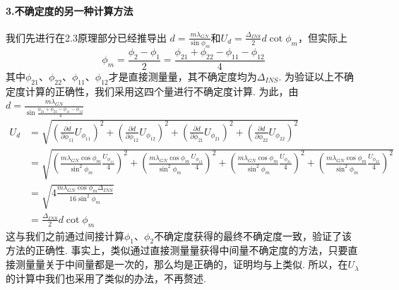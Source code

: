 \documentclass[UTF8]{ctexart}
\begin{document}
\paragraph{3.\quad 不确定度的另一种计算方法}\quad\par
我们先进行在2.3原理部分已经推导出
$\displaystyle{d=\frac{m\lambda_{GN}}{\sin\phi_m}}$和$\displaystyle{U_d=\frac{\Delta_{INS}}{2}d \cot\phi_m}$，但实际上
\[{\phi_m=\frac{\phi_2-\phi_1}{2}=\frac{\phi_{21}+\phi_{22}-\phi_{11}-\phi_{12}}{4}}\]
其中$\phi_{21}$、$\phi_{22}$、$\phi_{11}$、$\phi_{12}$才是直接测量量，其不确定度均为$\Delta_{INS}$. 为验证以上不确定度计算的正确性，我们采用这四个量进行不确定度计算. 为此，由$\displaystyle{d=\frac{m\lambda_{GN}}{\sin\frac{\phi_{21}+\phi_{22}-\phi_{11}-\phi_{12}}{4}}}$
\begin{equation}\begin{split}
    U_d&=
    \sqrt{(\frac{\partial d}{\partial \phi_{11}}U_{\phi_{11}})^2+(\frac{\partial d}{\partial \phi_{12}}U_{\phi_{12}})^2+(\frac{\partial d}{\partial \phi_{21}}U_{\phi_{21}})^2+(\frac{\partial d}{\partial \phi_{22}}U_{\phi_{22}})^2}\\
    &=\sqrt{
        (\frac{m\lambda_{GN}\cos\phi_m}
        {\sin^2\phi_m}\frac{U_{\phi_{11}}}{4})^2+
        (\frac{m\lambda_{GN}\cos\phi_m}
        {\sin^2\phi_m}\frac{U_{\phi_{12}}}{4})^2+
        (\frac{m\lambda_{GN}\cos\phi_m}
        {\sin^2\phi_m}\frac{U_{\phi_{21}}}{4})^2+
        (\frac{m\lambda_{GN}\cos\phi_m}
        {\sin^2\phi_m}\frac{U_{\phi_{22}}}{4})^2
    }\\
    &=\sqrt{4\frac{m\lambda_{GN}\cos\phi_m\Delta_{INS}}{16\sin^2\phi_m}}\\
    &=\frac{\Delta_{INS}}{2}d \cot\phi_m
\end{split}\end{equation}
这与我们之前通过间接计算$\phi_1$、$\phi_2$不确定度获得的最终不确定度一致，验证了该方法的正确性. 事实上，类似通过直接测量量获得中间量不确定度的方法，只要直接测量量关于中间量都是一次的，那么均是正确的，证明均与上类似. 所以，在$U_{\lambda}$的计算中我们也采用了类似的办法，不再赘述.
\end{document}
